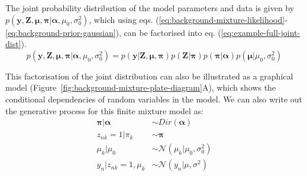The joint probability distribution of the model parameters and data is given by $p(\boldsymbol{y}, \boldsymbol{Z}, \boldsymbol{\mu}, \boldsymbol{\pi} \vert \boldsymbol{\alpha}, \allowbreak \mu_0,\sigma_0^2)$, which using eqs. (\ref{eq:background-mixture-likelihood}-\ref{eq:background-prior-gaussian}), can be factorised into eq. (\ref{eq:example-full-joint-dist}). 
\begin{equation}
p(\boldsymbol{y}, \boldsymbol{Z}, \boldsymbol{\mu}, \boldsymbol{\pi} \vert \boldsymbol{\alpha},\mu_0,\sigma_0^2) = p(\boldsymbol{y} \vert \boldsymbol{Z}, \boldsymbol{\mu},\boldsymbol{\pi}) p(\boldsymbol{Z} \vert \boldsymbol{\pi}) p(\boldsymbol{\pi} \vert \boldsymbol{\alpha}) p(\boldsymbol{\mu} \vert \mu_0, \sigma_0^2)
\label{eq:example-full-joint-dist}
\end{equation}

This factorisation of the joint distribution can also be illustrated as a graphical model (Figure~\ref{fig:background-mixture-plate-diagram}A), which shows the conditional dependencies of random variables in the model. We can also write out the generative process for this finite mixture model as:
\begin{equation}
\begin{aligned}
\boldsymbol{\pi} \vert \boldsymbol{\alpha} &\sim Dir(\boldsymbol{\alpha}) \\
z_{nk}=1 \vert \pi_k                                  &\sim \boldsymbol{\pi} \\
\mu_k \vert \mu_0                                    &\sim \mathcal{N}(\mu_k \vert \mu_0, \sigma_0^2) \\
y_n \vert z_{nk}=1, \mu_k                         &\sim \mathcal{N}(y_n \vert \mu, \sigma^2)
\end{aligned}
\label{eq:background-finite-mixture}
\end{equation}

